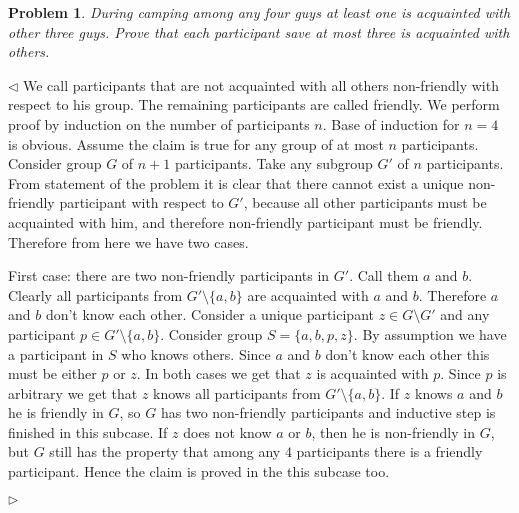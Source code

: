 \documentclass[12pt]{article}
\newtheorem{problem}{Problem}[subsection]
\newenvironment{solution}{\par $\triangleleft$}{$\triangleright$}
\begin{document}
\begin{problem} During camping among any four guys at least one is acquainted
with other three guys. Prove that each participant save at most three is
acquainted with others.
\end{problem}
\begin{solution} We call participants that are not acquainted with all others
    non-friendly with respect to his group. The remaining participants are
    called friendly. We perform proof by induction on the number of participants
    $n$. Base of induction for $n=4$ is obvious. Assume the claim is true for
    any group of at most $n$ participants. Consider group $G$ of $n+1$
    participants. Take any subgroup $G'$ of $n$ participants. From statement of
    the problem it is clear that there cannot exist a unique non-friendly
    participant with respect to $G'$, because all other participants must be
    acquainted with him, and therefore non-friendly participant must be
    friendly. Therefore from here we have two cases.

    First case: there are two non-friendly participants in $G'$. Call them $a$
    and $b$. Clearly all participants from $G'\setminus \{a,b\}$ are acquainted
    with $a$ and $b$. Therefore $a$ and $b$ don't know each other. Consider a
    unique participant $z\in G\setminus G'$ and any participant 
    $p\in G'\setminus \{a,b\}$. Consider group $S=\{a,b,p,z\}$. By assumption 
    we have a participant in $S$ who knows others. Since $a$ and $b$ don't know 
    each other this must be either $p$ or $z$. In both cases we get that $z$ is
    acquainted with $p$. Since $p$ is arbitrary we get that $z$ knows all
    participants from $G'\setminus \{a,b\}$. If $z$ knows $a$ and $b$ he is
    friendly in $G$, so $G$ has two non-friendly participants and inductive step
    is finished in this subcase. If $z$ does not know $a$ or $b$, then he is
    non-friendly in $G$, but $G$ still has the property that among any $4$
    participants there is a friendly participant. Hence the claim is proved in
    the this subcase too.


\end{solution}
\end{document}
